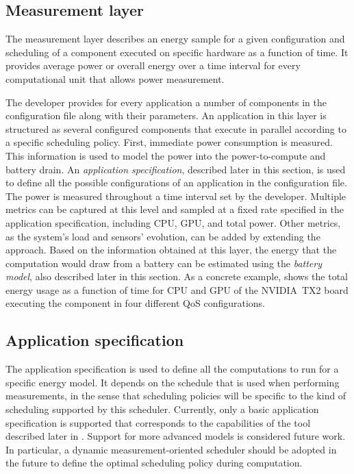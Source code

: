 \subsection{\color{cyan}Measurement layer}

The measurement layer describes an energy sample for a given configuration and scheduling of a component executed on specific hardware as a function of time. It provides average power or overall energy over a time interval for every computational unit that allows power measurement.

The developer provides for every application a number of components in the configuration file along with their parameters. An application in this layer is structured as several configured components that execute in parallel according to a specific scheduling policy. First, immediate power consumption is measured. This information is used to model the power into the power-to-compute and battery drain. An \emph{application specification}, described later in this section, is used to define all the possible configurations of an application in the configuration file. The power is measured throughout a time interval set by the developer. Multiple metrics can be captured at this level and sampled at a fixed rate specified in the application specification, including CPU, GPU, and total power. Other metrics, as the system's load and sensors' evolution, can be added by extending the approach. Based on the information obtained at this layer, the energy that the computation would draw from a battery can be estimated using the \emph{battery model}, also described later in this section. As a concrete example,  shows the total energy usage as a function of time for CPU and GPU of the NVIDIA~TX2 board executing the  component in four different QoS configurations.

\subsection{\color{cyan}Application specification}
\label{sec:measurement:application-specification}

The application specification is used to define all the computations to run for a specific energy model. It depends on the schedule that is used when performing measurements, in the sense that scheduling policies will be specific to the kind of scheduling supported by this scheduler. Currently, only a basic application specification is supported that corresponds to the capabilities of the \powprof{} tool described later in . Support for more advanced models is considered future work. In particular, a dynamic measurement-oriented scheduler should be adopted in the future to define the optimal scheduling policy during computation.

